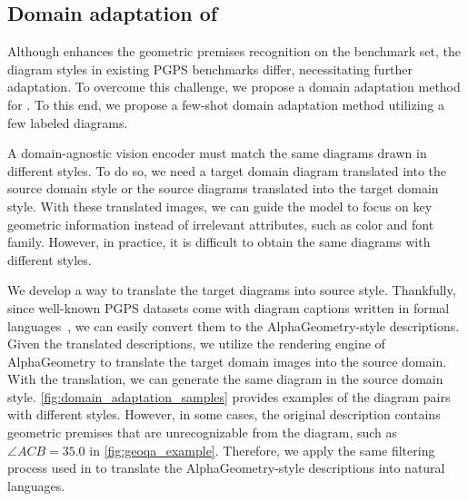 


\subsection{Domain adaptation of \geoclip{}}
\label{sec:domain_adaptation}

Although \geoclip{} enhances the geometric premises recognition on the benchmark set, the diagram styles in existing PGPS benchmarks differ, necessitating further adaptation. To overcome this challenge, we propose a domain adaptation method for \geoclip{}. To this end, we propose a few-shot domain adaptation method utilizing a few labeled diagrams.

A domain-agnostic vision encoder must match the same diagrams drawn in different styles. To do so, we need a target domain diagram translated into the source domain style or the source diagrams translated into the target domain style. With these translated images, we can guide the model to focus on key geometric information instead of irrelevant attributes, such as color and font family. However, in practice, it is difficult to obtain the same diagrams with different styles. 

We develop a way to translate the target diagrams into source style.
Thankfully, since well-known PGPS datasets come with diagram captions written in formal languages~\citep{intergps}, we can easily convert them to the AlphaGeometry-style descriptions. 
Given the translated descriptions, we utilize the rendering engine of AlphaGeometry to translate the target domain images into the source domain. 
With the translation, we can generate the same diagram in the source domain style. 
\cref{fig:domain_adaptation_samples} provides examples of the diagram pairs with different styles. However, in some cases, the original description contains geometric premises that are unrecognizable from the diagram, such as \(\angle ACB = 35.0\) in \cref{fig:geoqa_example}. Therefore, we apply the same filtering process used in \geoclip{} to translate the AlphaGeometry-style descriptions into natural languages.

